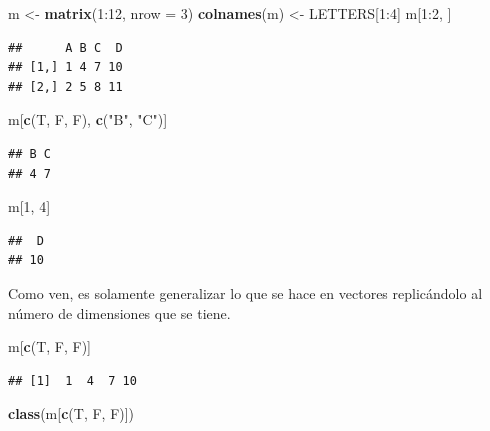 \documentclass[]{article}
\newenvironment{Shaded}{\begin{snugshade}}{\end{snugshade}}
\newcommand{\KeywordTok}[1]{\textcolor[rgb]{0.13,0.29,0.53}{\textbf{{#1}}}}
\newcommand{\DataTypeTok}[1]{\textcolor[rgb]{0.13,0.29,0.53}{{#1}}}
\newcommand{\DecValTok}[1]{\textcolor[rgb]{0.00,0.00,0.81}{{#1}}}
\newcommand{\StringTok}[1]{\textcolor[rgb]{0.31,0.60,0.02}{{#1}}}
\newcommand{\NormalTok}[1]{{#1}}
\begin{document}
\begin{Shaded}
\begin{Highlighting}[]
\NormalTok{m <-}\StringTok{ }\KeywordTok{matrix}\NormalTok{(}\DecValTok{1}\NormalTok{:}\DecValTok{12}\NormalTok{, }\DataTypeTok{nrow =} \DecValTok{3}\NormalTok{)}
\KeywordTok{colnames}\NormalTok{(m) <-}\StringTok{ }\NormalTok{LETTERS[}\DecValTok{1}\NormalTok{:}\DecValTok{4}\NormalTok{]}
\NormalTok{m[}\DecValTok{1}\NormalTok{:}\DecValTok{2}\NormalTok{, ]}
\end{Highlighting}
\end{Shaded}

\begin{verbatim}
##      A B C  D
## [1,] 1 4 7 10
## [2,] 2 5 8 11
\end{verbatim}

\begin{Shaded}
\begin{Highlighting}[]
\NormalTok{m[}\KeywordTok{c}\NormalTok{(T, F, F), }\KeywordTok{c}\NormalTok{(}\StringTok{"B"}\NormalTok{, }\StringTok{"C"}\NormalTok{)]}
\end{Highlighting}
\end{Shaded}

\begin{verbatim}
## B C 
## 4 7
\end{verbatim}

\begin{Shaded}
\begin{Highlighting}[]
\NormalTok{m[}\DecValTok{1}\NormalTok{, }\DecValTok{4}\NormalTok{]}
\end{Highlighting}
\end{Shaded}

\begin{verbatim}
##  D 
## 10
\end{verbatim}

Como ven, es solamente generalizar lo que se hace en vectores
replicándolo al número de dimensiones que se tiene.

\begin{Shaded}
\begin{Highlighting}[]
\NormalTok{m[}\KeywordTok{c}\NormalTok{(T, F, F)]}
\end{Highlighting}
\end{Shaded}

\begin{verbatim}
## [1]  1  4  7 10
\end{verbatim}

\begin{Shaded}
\begin{Highlighting}[]
\KeywordTok{class}\NormalTok{(m[}\KeywordTok{c}\NormalTok{(T, F, F)])}
\end{Highlighting}
\end{Shaded}
\end{document}
